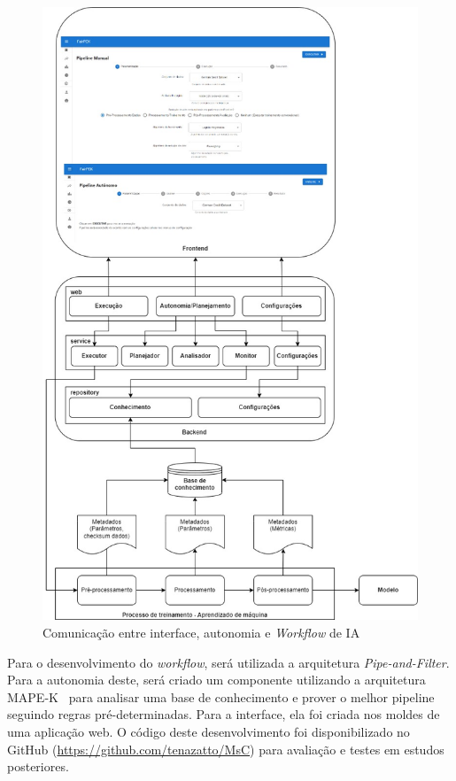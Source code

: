 \documentclass[posterIC]{a0poster}
\begin{document}
\begin{multicols}{2}
\begin{figure}
\centering
\includegraphics[scale=0.4]{images/backend-frontend-ml.jpg}
\caption {Comunicação entre interface, autonomia e \textit{Workflow} de IA}
\label{fig:SystemCommunication}
\end{figure}

Para o desenvolvimento do \textit{workflow}, será utilizada a arquitetura \textit{Pipe-and-Filter}. Para a autonomia deste, será criado um componente utilizando a arquitetura MAPE-K~\cite{IBM_2005} para analisar uma base de conhecimento e prover o melhor pipeline seguindo regras pré-determinadas. Para a interface, ela foi criada nos moldes de uma aplicação web. O código deste desenvolvimento foi disponibilizado no GitHub (\url{https://github.com/tenazatto/MsC}) para avaliação e testes em estudos posteriores. 


\end{multicols}
\end{document}
